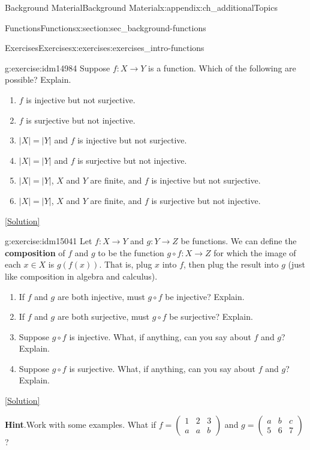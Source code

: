 \documentclass[oneside,10pt,]{book}
\newcommand{\terminology}[1]{\textbf{#1}}
\numberwithin{equation}{chapter}
\newcommand{\twoline}[2]{\begin{pmatrix}#1 \\ #2 \end{pmatrix}}
\newcommand{\amp}{&}
\begin{document}
\begin{appendixptx}{Background Material}{}{Background Material}{}{}{x:appendix:ch_additionalTopics}
\begin{sectionptx}{Functions}{}{Functions}{}{}{x:section:sec_background-functions}
\begin{exercises-subsection}{Exercises}{}{Exercises}{}{}{x:exercises:exercises_intro-functions}
\begin{divisionexercise}{12}{}{}{g:exercise:idm14984}%
Suppose \(f:X \to Y\) is a function. Which of the following are possible? Explain.%
\begin{enumerate}[label=(\alph*)]
\item{}\(f\) is injective but not surjective.%
\item{}\(f\) is surjective but not injective.%
\item{}\(|X| = |Y|\) and \(f\) is injective but not surjective.%
\item{}\(|X| = |Y|\) and \(f\) is surjective but not injective.%
\item{}\(|X| = |Y|\), \(X\) and \(Y\) are finite, and \(f\) is injective but not surjective.%
\item{}\(|X| = |Y|\), \(X\) and \(Y\) are finite, and \(f\) is surjective but not injective.%
\end{enumerate}
%
\space\hspace*{0pt}\hfill{\tiny\hyperlink{g:solution:idm15009-main}{[Solution]}}\end{divisionexercise}%
\begin{divisionexercise}{13}{}{}{g:exercise:idm15041}%
Let \(f:X \to Y\) and \(g:Y \to Z\) be functions.  We can define the \terminology{composition} of \(f\) and \(g\) to be the function \(g\circ f:X \to Z\) for which the image of each \(x \in X\) is \(g(f(x))\).  That is, plug \(x\) into \(f\), then plug the result into \(g\) (just like composition in algebra and calculus).%
\par
%
\begin{enumerate}[label=(\alph*)]
\item{}If \(f\) and \(g\) are both injective, must \(g\circ f\) be injective?  Explain.%
\item{}If \(f\) and \(g\) are both surjective, must \(g\circ f\) be surjective?  Explain.%
\item{}Suppose \(g\circ f\) is injective.  What, if anything, can you say about \(f\) and \(g\)?  Explain.%
\item{}Suppose \(g\circ f\) is surjective.  What, if anything, can you say about \(f\) and \(g\)?  Explain.%
\end{enumerate}
%
\space\hspace*{0pt}\hfill{\tiny\hyperlink{g:solution:idm15083-main}{[Solution]}}\par\smallskip%
\noindent\textbf{Hint}.\hypertarget{g:hint:idm15079}{}\quad{}Work with some examples.  What if \(f = \twoline{1\amp 2 \amp 3}{a \amp a \amp b}\) and \(g = \twoline{a\amp b \amp c}{5 \amp 6 \amp 7}\)?%

\end{divisionexercise}
\end{exercises-subsection}
\end{sectionptx}
\end{appendixptx}
\end{document}
